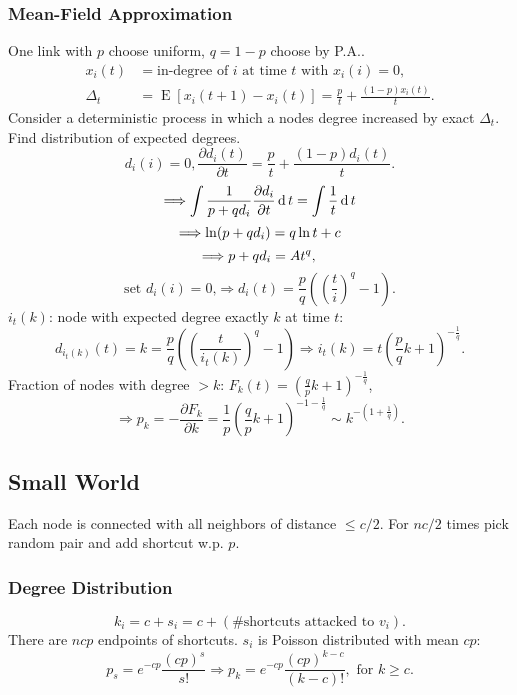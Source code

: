 \documentclass[a4paper,twocolumn,10pt]{article}
\newcommand{\pte}[1]{\left({#1}\right)}
\newcommand{\op}{\operatorname}
\newcommand{\E}{\operatorname{E}}
\newcommand{\dd}{\op{d}}
\begin{document}
	\subsubsection{Mean-Field Approximation}
		One link with $p$ choose uniform, $q=1-p$ choose by P.A..
		\[ \begin{split}
			x_i(t) &= \textrm{in-degree of $i$ at time $t$ with $x_i(i)=0$}, \\
			\Delta_t &= \E[x_i(t+1)-x_i(t)]  = \frac{p}{t} + \frac{(1-p)x_i(t)}{t}.
		\end{split} \]
		Consider a deterministic process in which a nodes degree increased by exact $\Delta_t$.
		Find distribution of expected degrees.
		\[
			d_i(i) = 0, \frac{\partial d_i(t)}{\partial t} = \frac{p}{t} + \frac{(1-p)d_i(t)}{t}.
		\]
		\[
			\Longrightarrow \int \frac{1}{p+q d_i} \frac{\partial d_i}{\partial t} \dd t = \int \frac{1}{t} \dd t \\
		\] \[
			\Longrightarrow \ln(p+q d_i) = q \ln t + c \\
		\] \[
			\Longrightarrow p+q d_i = A t^q, \\
		\] \[
			\textrm{set $d_i(i)=0$,}\Longrightarrow d_i(t) = \frac{p}{q}\pte{\pte{\frac{t}{i}}^q-1}.
		\]
		$i_t(k)$: node with expected degree exactly $k$ at time $t$:
		\[
			d_{i_t(k)}(t) = k = \frac{p}{q}\pte{\pte{\frac{t}{i_t(k)}}^q-1}
			\Longrightarrow
			i_t(k)=t\pte{\frac{p}{q}k+1}^{-\frac{1}{q}}.
		\]
		Fraction of nodes with degree $>k$:
			$F_k(t) = \pte{\frac{q}{p}k+1} ^ {-\frac{1}{q}}$,
		\[
			\Longrightarrow
			p_k=-\frac{\partial F_k}{\partial k}
			=\frac{1}{p}\pte{\frac{q}{p}k+1}^{-1-\frac{1}{q}}
			\sim k^{-\pte{1+\frac{1}{q}}}.
		\]

\subsection{Small World}
	Each node is connected with all neighbors of distance $\le c/2$.
	For $nc/2$ times pick random pair and add shortcut w.p. $p$.

	\subsubsection{Degree Distribution}
		\[
			k_i = c + s_i = c + (\#\textrm{shortcuts attacked to $v_i$}).
		\]
		There are $ncp$ endpoints of shortcuts. $s_i$ is Poisson distributed
			with mean $cp$:
		\[
			p_s = e^{-cp}\frac{(cp)^s}{s!} \Longrightarrow
			p_k = e^{-cp}\frac{(cp)^{k - c}}{(k - c)!}, \textrm{ for }k \ge c.
		\]
	
\end{document}
